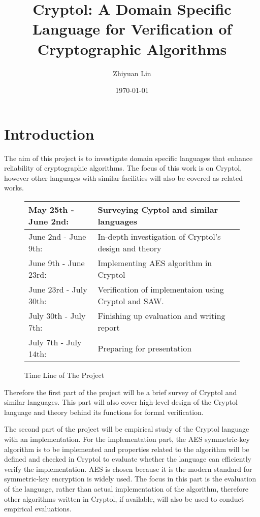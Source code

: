 \documentclass[a4paper, notitlepage]{report}
\title{Cryptol: A Domain Specific Language for  Verification of Cryptographic Algorithms}
\author{Zhiyuan Lin}
\date{\today}
\begin{document}
\maketitle
\begin{abstract}

\end{abstract}

\newpage

\tableofcontents

\newpage


\chapter{Introduction}

The aim of this project is to investigate domain specific languages
that enhance reliability of cryptographic algorithms. The focus of this
work is on Cryptol, however other languages with similar facilities will
also be covered as related works.

\begin{figure}[h]
  \centering
\begin{tabular}{| l | p{5cm} |}
  \hline
  May 25th - June 2nd: & Surveying Cyptol and similar languages \\
  \hline
  June 2nd - June 9th: & In-depth investigation of Cryptol's design and theory \\
  \hline
  June 9th - June 23rd: & Implementing AES algorithm in Cryptol \\
  \hline
  June 23rd - July 30th: & Verification of implementaion using Cryptol and SAW. \\
  \hline
  July 30th - July 7th: & Finishing up evaluation and writing report \\
  \hline
  July 7th - July 14th: & Preparing for presentation \\
  \hline
\end{tabular}
\caption{Time Line of The Project}
\label{fig:time}
\end{figure}


Therefore the first part of the project will be a brief survey of Cryptol
and similar languages. This part will also cover high-level design of
the Cryptol language and theory behind its functions for formal verification.

The second part of the project will be empirical study of the Cryptol language
with an implementation.
For the implementation part, the AES symmetric-key algorithm
\cite{standard2001announcing, bertoni2002efficient} is to be implemented
 and properties related to the algorithm will be defined and checked
in Cryptol to evaluate whether the language can efficiently verify
the implementation. AES is chosen because it is the modern standard
for symmetric-key encryption is widely used. 
The focus in this part is the evaluation of the language,
rather than actual implementation of the algorithm, therefore other
algorithms written in Cryptol, if available, will
also be used to conduct empirical evaluations.
\end{document}
